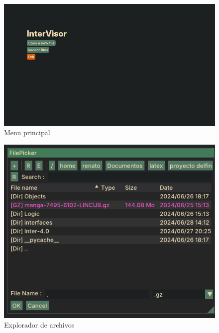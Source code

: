 \documentclass[9pt,twocolumn,a4paper]{opticajnl}
\begin{document}
\begin{figure}
    \centering
    \includegraphics[width=1\linewidth]{menuprincipal1.png}
    \caption{Menu principal}
    \label{fig:menuprincipal1}
\end{figure}

\begin{figure}
    \centering
    \includegraphics[width=1\linewidth]{file_explorer_visor.png}
    \caption{Explorador de archivos}
    \label{fig:file_explorer_visor}
\end{figure}
\end{document}
